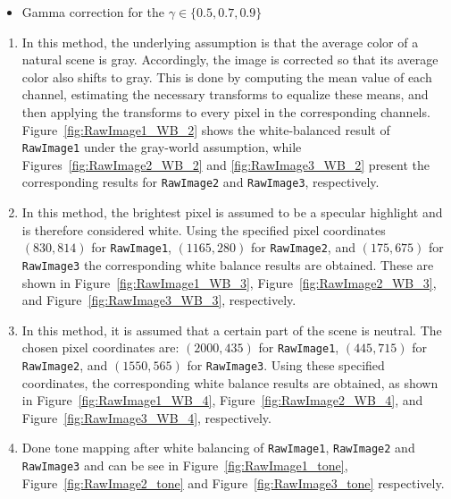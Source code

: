 \documentclass[11pt, a4]{article}
\begin{document}
\begin{enumerate}
\begin{itemize}
			\item Gamma correction for the $\gamma\in\{0.5, 0.7, 0.9\}$
		\end{itemize}
		\begin{enumerate}
			\item In this method, the underlying assumption is that the average color of a natural scene is gray. 
			Accordingly, the image is corrected so that its average color also shifts to gray. 
			This is done by computing the mean value of each channel, estimating the necessary transforms to equalize these means, and then applying the transforms to every pixel in the corresponding channels. 
			Figure~\ref{fig:RawImage1_WB_2} shows the white-balanced result of \texttt{RawImage1} under the gray-world assumption, while Figures~\ref{fig:RawImage2_WB_2} and \ref{fig:RawImage3_WB_2} present the corresponding results for \texttt{RawImage2} and \texttt{RawImage3}, respectively.  
			\item In this method, the brightest pixel is assumed to be a specular highlight and is therefore considered white. 
			Using the specified pixel coordinates $(830, 814)$ for \texttt{RawImage1}, $(1165, 280)$ for \texttt{RawImage2}, and $(175, 675)$ for \texttt{RawImage3} the corresponding white balance results are obtained. These are shown in Figure~\ref{fig:RawImage1_WB_3}, Figure~\ref{fig:RawImage2_WB_3}, and Figure~\ref{fig:RawImage3_WB_3}, respectively.
			\item  In this method, it is assumed that a certain part of the scene is neutral. 
			The chosen pixel coordinates are: $(2000, 435)$ for \texttt{RawImage1}, $(445, 715)$ for \texttt{RawImage2}, and $(1550, 565)$ for \texttt{RawImage3}. 
			Using these specified coordinates, the corresponding white balance results are obtained, as shown in Figure~\ref{fig:RawImage1_WB_4}, Figure~\ref{fig:RawImage2_WB_4}, and Figure~\ref{fig:RawImage3_WB_4}, respectively.  	
			\item Done tone mapping after white balancing of \texttt{RawImage1}, \texttt{RawImage2} and \texttt{RawImage3} and can be see in Figure~\ref{fig:RawImage1_tone}, Figure~\ref{fig:RawImage2_tone} and Figure~\ref{fig:RawImage3_tone} respectively.
			\begin{figure}[h]
				\centering
\end{figure}
\end{enumerate}
\end{enumerate}
\end{document}

